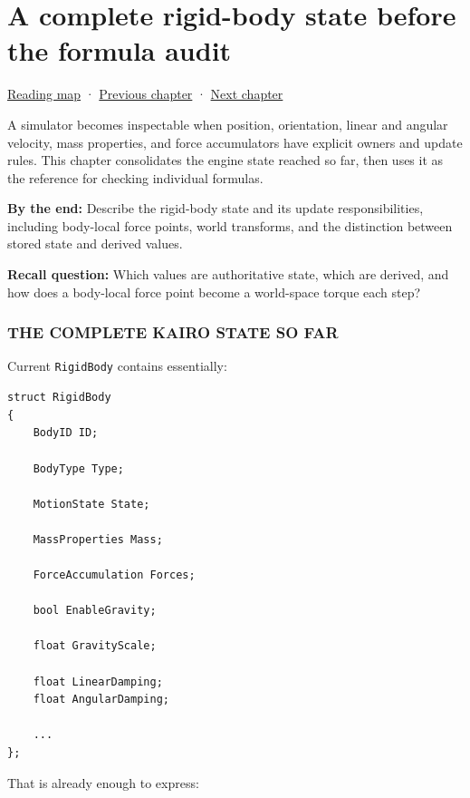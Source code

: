 \chapter{A complete rigid-body state before the formula audit}\label{06-engine-ii-ch035-a-complete-rigid-body-state-before-the-formula-audit}\hypertarget{06-engine-ii-ch035}{}\label{stagechapter:06-engine-ii-ch035}

\hyperref[volume-reading-map]{Reading map} · \hyperref[06-engine-ii-ch034-rigid-body-motion-from-forces-to-contact]{Previous chapter} · \hyperref[06-engine-ii-ch036-auditing-capsule-mass-properties-and-collision-formulas]{Next chapter}

A simulator becomes inspectable when position, orientation, linear and angular velocity, mass properties, and force accumulators have explicit owners and update rules. This chapter consolidates the engine state reached so far, then uses it as the reference for checking individual formulas.

\textbf{By the end:} Describe the rigid-body state and its update responsibilities, including body-local force points, world transforms, and the distinction between stored state and derived values.

\textbf{Recall question:} Which values are authoritative state, which are derived, and how does a body-local force point become a world-space torque each step?

\subsection{THE COMPLETE KAIRO STATE SO FAR}\label{06-engine-ii-ch035-the-complete-kairo-state-so-far}

Current \texttt{RigidBody} contains essentially:

\begin{verbatim}
struct RigidBody
{
    BodyID ID;

    BodyType Type;

    MotionState State;

    MassProperties Mass;

    ForceAccumulation Forces;

    bool EnableGravity;

    float GravityScale;

    float LinearDamping;
    float AngularDamping;

    ...
};
\end{verbatim}

That is already enough to express:

